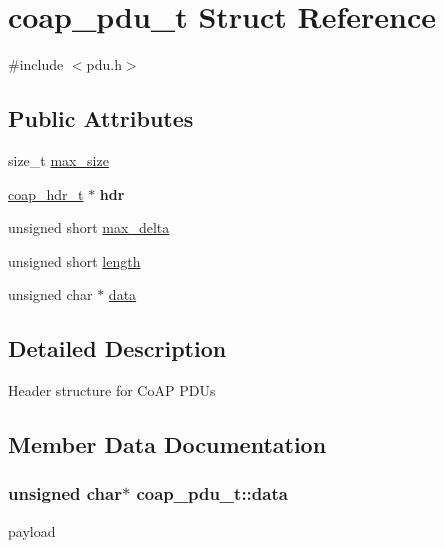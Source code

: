 \hypertarget{structcoap__pdu__t}{}\section{coap\+\_\+pdu\+\_\+t Struct Reference}
\label{structcoap__pdu__t}


{\ttfamily \#include $<$pdu.\+h$>$}

\subsection*{Public Attributes}
\begin{DoxyCompactItemize}
\item 
size\+\_\+t \hyperlink{structcoap__pdu__t_a5bd82194d62c90d9243313cbbbe26d47}{max\+\_\+size}
\item 
\hypertarget{structcoap__pdu__t_a887fff4f168898168df8e9f3375acc3c}{}\hyperlink{structcoap__hdr__t}{coap\+\_\+hdr\+\_\+t} $\ast$ {\bfseries hdr}\label{structcoap__pdu__t_a887fff4f168898168df8e9f3375acc3c}

\item 
unsigned short \hyperlink{structcoap__pdu__t_ac7cdcc1db653a3aee1f2ba1180387e2b}{max\+\_\+delta}
\item 
unsigned short \hyperlink{structcoap__pdu__t_aa111aeb4cf9070cea513fda7ced34286}{length}
\item 
unsigned char $\ast$ \hyperlink{structcoap__pdu__t_adfab9830341fc4ee42655571ac9b4f98}{data}
\end{DoxyCompactItemize}


\subsection{Detailed Description}
Header structure for Co\+A\+P P\+D\+Us 

\subsection{Member Data Documentation}
\hypertarget{structcoap__pdu__t_adfab9830341fc4ee42655571ac9b4f98}{}
\subsubsection[{data}]{\setlength{\rightskip}{0pt plus 5cm}unsigned char$\ast$ coap\+\_\+pdu\+\_\+t\+::data}\label{structcoap__pdu__t_adfab9830341fc4ee42655571ac9b4f98}
payload \hypertarget{structcoap__pdu__t_aa111aeb4cf9070cea513fda7ced34286}{}
